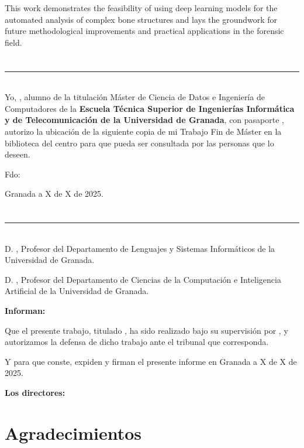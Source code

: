 This work demonstrates the feasibility of using deep learning models for the automated analysis of complex bone structures and lays the groundwork for future methodological improvements and practical applications in the forensic field.
\chapter*{}
\thispagestyle{empty}

\noindent\rule[-1ex]{\textwidth}{2pt}\\[4.5ex]

Yo, \textbf{\myName}, alumno de la titulación Máster de Ciencia de Datos e Ingeniería de Computadores de la \textbf{Escuela Técnica Superior
de Ingenierías Informática y de Telecomunicación de la Universidad de Granada}, con pasaporte \myDNI, autorizo la
ubicación de la siguiente copia de mi Trabajo Fin de Máster en la biblioteca del centro para que pueda ser
consultada por las personas que lo deseen.

\vspace{6cm}

\noindent Fdo: \myName

\vspace{2cm}

\begin{flushright}
Granada a X de X de 2025.
\end{flushright}


\chapter*{}
\thispagestyle{empty}

\noindent\rule[-1ex]{\textwidth}{2pt}\\[4.5ex]

D. \textbf{\myProf}, Profesor del Departamento de Lenguajes y Sistemas Informáticos de la Universidad de Granada.

\vspace{0.25cm}

D. \textbf{\myOtherProf}, Profesor del Departamento de Ciencias de la Computación e Inteligencia Artificial de la Universidad de Granada.


\vspace{0.25cm}

\textbf{Informan:}

\vspace{0.25cm}

Que el presente trabajo, titulado \textit{\textbf{\myTitle}},
ha sido realizado bajo su supervisión por \textbf{\myName}, y autorizamos la defensa de dicho trabajo ante el tribunal
que corresponda.

\vspace{0.5cm}

Y para que conste, expiden y firman el presente informe en Granada a X de X de 2025.

\vspace{0.5cm}

\textbf{Los directores:}

\vspace{5cm}

\noindent \textbf{\myProf \hfill
\myOtherProf}

\chapter*{Agradecimientos}
\thispagestyle{empty}

       \vspace{1cm}
